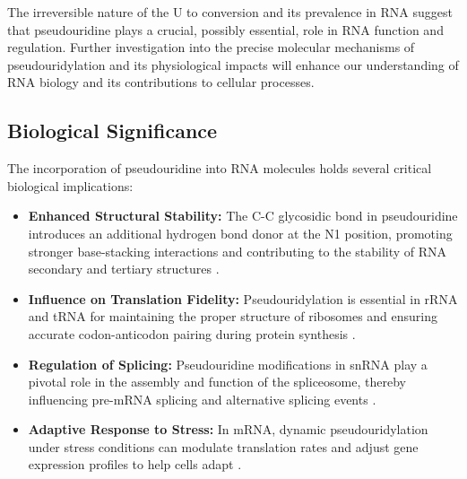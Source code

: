   The irreversible nature of the U to \pseudo conversion and its prevalence in RNA suggest that pseudouridine plays a crucial, possibly essential, role in RNA function and regulation.
  Further investigation into the precise molecular mechanisms of pseudouridylation and its physiological impacts will enhance our understanding of RNA biology and its contributions to cellular processes.



  \subsection{Biological Significance}\label{subsec:biological-significance}

    The incorporation of pseudouridine into RNA molecules holds several critical biological implications:

    \begin{itemize}
      \item \textbf{Enhanced Structural Stability:} The C-C glycosidic bond in pseudouridine introduces an additional hydrogen bond donor at the N1 position, promoting stronger base-stacking interactions and contributing to the stability of RNA secondary and tertiary structures \cite{newby2002nmr}.
      \item \textbf{Influence on Translation Fidelity:} Pseudouridylation is essential in rRNA and tRNA for maintaining the proper structure of ribosomes and ensuring accurate codon-anticodon pairing during protein synthesis \cite{decatur2005snoRNA}.
      \item \textbf{Regulation of Splicing:} Pseudouridine modifications in snRNA play a pivotal role in the assembly and function of the spliceosome, thereby influencing pre-mRNA splicing and alternative splicing events \cite{karijolich2010pseudouridylation}.
      \item \textbf{Adaptive Response to Stress:} In mRNA, dynamic pseudouridylation under stress conditions can modulate translation rates and adjust gene expression profiles to help cells adapt \cite{jackson2012mRNA}.
    \end{itemize}

